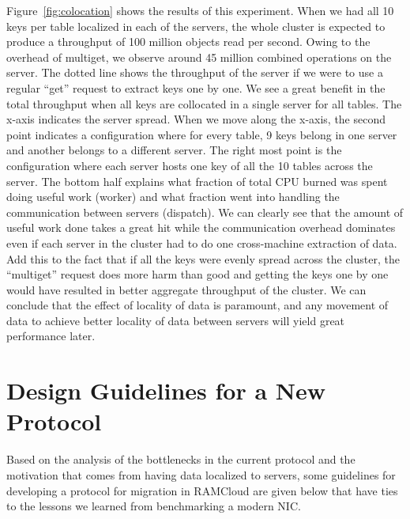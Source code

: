 Figure~\ref{fig:colocation} shows the results of this experiment. When we had all 10 keys per table localized in each of the servers, the whole cluster is expected to produce a throughput of 100 million objects read per second.
Owing to the overhead of multiget, we observe around 45 million combined operations on the server. The dotted line shows the throughput of the server if we were to use a regular ``get'' request to extract keys one by one.
We see a great benefit in the total throughput when all keys are collocated in a single server for all tables. The x-axis indicates the server spread. When we move along the x-axis, the second point indicates a configuration where for every table, 9 keys belong in one server and 
another belongs to a different server. The right most point is the configuration where each server hosts one key of all the 10 tables across the server. The bottom half explains what fraction of total CPU burned was spent 
doing useful work (worker) and what fraction went into handling the communication between servers (dispatch). 
We can clearly see that the amount of useful work done takes a great hit while the communication overhead dominates 
even if each server in the cluster had to do one cross-machine extraction of data. Add this to the fact that if all the keys were evenly spread across the cluster, the ``multiget'' request does more harm than good and getting the 
keys one by one would have resulted in better aggregate throughput of the cluster. We can conclude that the effect of locality of data is paramount, and any movement of data to achieve better locality of data between servers will yield 
great performance later.
\section{Design Guidelines for a New Protocol}
Based on the analysis of the bottlenecks in the current protocol and the motivation that comes from having data localized to servers, some guidelines for developing a protocol for migration in RAMCloud
are given below that have ties to the lessons we learned from benchmarking a modern NIC.

